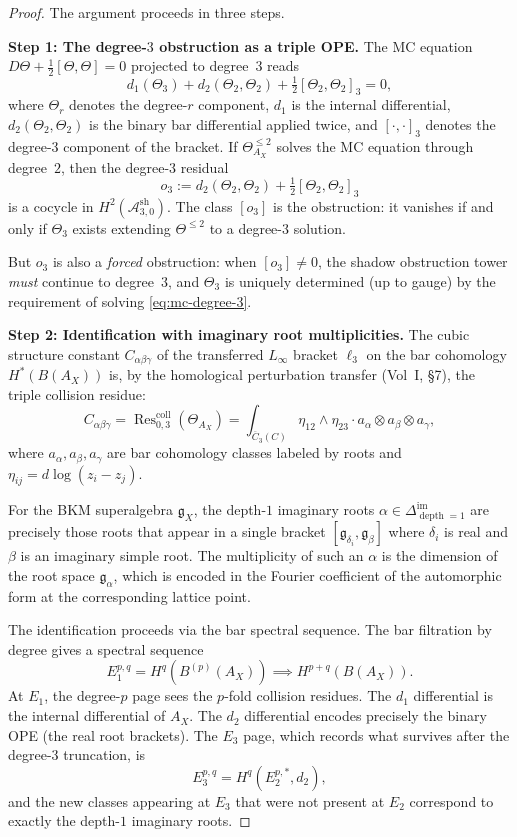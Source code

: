 \documentclass[11pt]{amsart}
\theoremstyle{definition}
\theoremstyle{remark}
\DeclareMathOperator{\Res}{Res}
\DeclareMathOperator{\depth}{depth}
\newcommand{\cA}{\mathcal{A}}
\newcommand{\fg}{\mathfrak{g}}
\begin{document}
\begin{proof}
The argument proceeds in three steps.

\medskip
\noindent\textbf{Step 1: The degree-$3$ obstruction as a triple OPE.}
The MC equation $D\Theta + \tfrac{1}{2}[\Theta, \Theta] = 0$
projected to degree~$3$ reads
\begin{equation}\label{eq:mc-degree-3}
 d_1(\Theta_3) + d_2(\Theta_2, \Theta_2)
 + \tfrac{1}{2}[\Theta_2, \Theta_2]_3 = 0,
\end{equation}
where $\Theta_r$ denotes the degree-$r$ component, $d_1$ is the
internal differential, $d_2(\Theta_2, \Theta_2)$ is the binary
bar differential applied twice, and $[\cdot,\cdot]_3$ denotes
the degree-$3$ component of the bracket. If
$\Theta^{\leq 2}_{A_X}$ solves the MC equation through
degree~$2$, then the degree-$3$ residual
\[
 o_3 := d_2(\Theta_2, \Theta_2)
 + \tfrac{1}{2}[\Theta_2, \Theta_2]_3
\]
is a cocycle in $H^2(\cA^{\mathrm{sh}}_{3,0})$. The class
$[o_3]$ is the obstruction: it vanishes if and only if $\Theta_3$
exists extending $\Theta^{\leq 2}$ to a degree-$3$ solution.

But $o_3$ is also a \emph{forced} obstruction: when
$[o_3] \neq 0$, the shadow obstruction tower \emph{must} continue to
degree~$3$, and $\Theta_3$ is uniquely determined (up to gauge)
by the requirement of solving \eqref{eq:mc-degree-3}.

\medskip
\noindent\textbf{Step 2: Identification with imaginary root
multiplicities.}
The cubic structure constant $C_{\alpha\beta\gamma}$ of the
transferred $L_\infty$ bracket $\ell_3$ on the bar cohomology
$H^*(B(A_X))$ is, by the homological perturbation transfer
(Vol~I, \S7), the triple collision residue:
\[
 C_{\alpha\beta\gamma}
 = \Res^{\mathrm{coll}}_{0,3}(\Theta_{A_X})
 = \int_{\overline{C}_3(C)}
 \eta_{12} \wedge \eta_{23} \cdot
 a_\alpha \otimes a_\beta \otimes a_\gamma,
\]
where $a_\alpha, a_\beta, a_\gamma$ are bar cohomology classes
labeled by roots and $\eta_{ij} = d\log(z_i - z_j)$.

For the BKM superalgebra $\fg_X$, the depth-$1$ imaginary roots
$\alpha \in \Delta^{\mathrm{im}}_{\depth = 1}$ are precisely
those roots that appear in a single bracket $[\fg_{\delta_i},
\fg_\beta]$ where $\delta_i$ is real and $\beta$ is an
imaginary simple root. The multiplicity of such an $\alpha$
is the dimension of the root space $\fg_\alpha$, which is
encoded in the Fourier coefficient of the automorphic form at
the corresponding lattice point.

The identification proceeds via the bar spectral sequence.
The bar filtration by degree gives a spectral sequence
\[
 E_1^{p,q} = H^q(B^{(p)}(A_X)) \implies H^{p+q}(B(A_X)).
\]
At $E_1$, the degree-$p$ page sees the $p$-fold collision
residues. The $d_1$ differential is the internal differential
of $A_X$. The $d_2$ differential encodes precisely the binary
OPE (the real root brackets). The $E_3$ page, which records
what survives after the degree-$3$ truncation, is
\[
 E_3^{p,q} = H^q(E_2^{p,*}, d_2),
\]
and the new classes appearing at $E_3$ that were not present at
$E_2$ correspond to exactly the depth-$1$ imaginary roots.


\end{proof}
\end{document}
